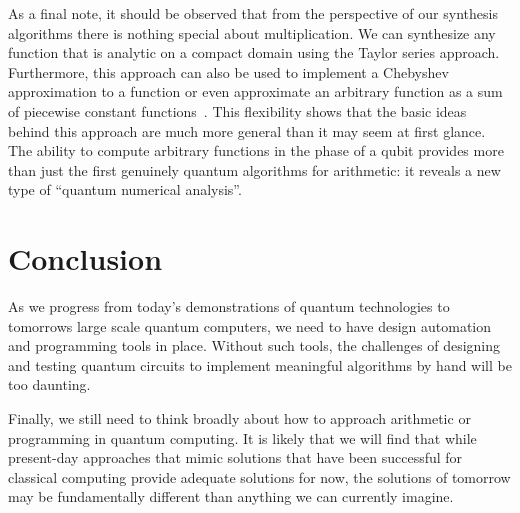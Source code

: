 \documentclass[conference]{IEEEtran}
\begin{document}
As a final note, it should be observed that from the perspective of our synthesis algorithms there is nothing special about multiplication.  We can synthesize any function that is analytic on a compact domain using the Taylor series approach.  Furthermore, this approach can also be used to implement a Chebyshev approximation to a function or even approximate an arbitrary function as a sum of piecewise constant functions~\cite{WR16}.  This flexibility shows that the basic ideas behind this approach are much more general than it may seem at first glance. The ability to compute arbitrary functions in the phase of a qubit provides more than just the first genuinely quantum algorithms for arithmetic: it reveals a new type of ``quantum numerical analysis''.

\section{Conclusion}
As we progress from today's demonstrations of quantum technologies to tomorrows large scale quantum computers, we need to have 
design automation and programming tools in place.  Without such tools, the challenges of designing and testing quantum circuits to implement meaningful
algorithms by hand will be too daunting. 

 Finally, we still need to think broadly about how to approach arithmetic or programming
in quantum computing.  It is likely that we will find that while present-day approaches that mimic solutions that have been successful for classical computing provide adequate solutions for now,
the solutions of tomorrow may be fundamentally different than anything we can currently imagine.




\end{document}
